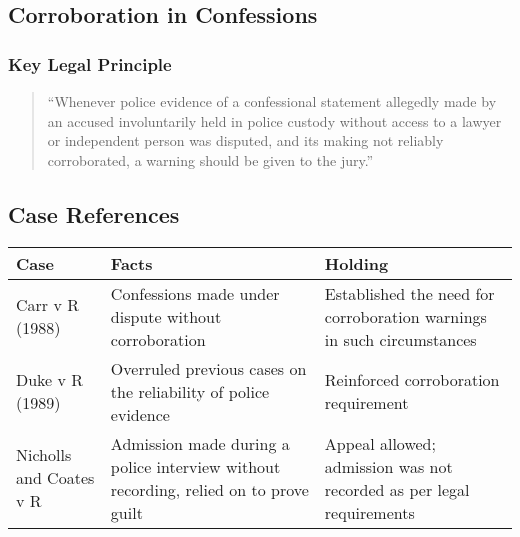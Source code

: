 \subsection{  Corroboration in
Confessions}\label{corroboration-in-confessions}

\subsubsection{Key Legal Principle}\label{key-legal-principle}

\begin{quote}
``Whenever police evidence of a confessional statement allegedly made by
an accused involuntarily held in police custody without access to a
lawyer or independent person was disputed, and its making not reliably
corroborated, a warning should be given to the jury.''
\end{quote}

\subsection{Case References}\label{case-references}

\begin{longtable}[]{@{}
  >{\raggedright\arraybackslash}p{}
  >{\raggedright\arraybackslash}p{}
  >{\raggedright\arraybackslash}p{}@{}}
\toprule\noalign{}
\begin{minipage}[b]{\linewidth}\raggedright
Case
\end{minipage} & \begin{minipage}[b]{\linewidth}\raggedright
Facts
\end{minipage} & \begin{minipage}[b]{\linewidth}\raggedright
Holding
\end{minipage} \\
\midrule\noalign{}
\endhead
\bottomrule\noalign{}
\endlastfoot
Carr v R (1988) & Confessions made under dispute without corroboration &
Established the need for corroboration warnings in such circumstances \\
Duke v R (1989) & Overruled previous cases on the reliability of police
evidence & Reinforced corroboration requirement \\
Nicholls and Coates v R & Admission made during a police interview
without recording, relied on to prove guilt & Appeal allowed; admission
was not recorded as per legal requirements \\
\end{longtable}

